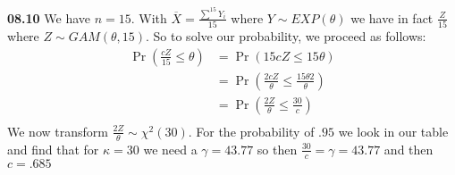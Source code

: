 {\bf 08.10} We have $n = 15$. With $\overline{X} = \frac{\sum^{15} Y_{i}}{15}$ where $Y \sim EXP(\theta)$ we have
in fact $\frac{Z}{15}$ where $Z \sim GAM(\theta,15)$. So to solve our probability, we proceed as follows: \\

\begin{align*}
	\Pr \left( \frac{c Z}{15} \leq \theta \right) & = \Pr \left( 15 c Z  \leq 15 \theta \right) \\
	& = \Pr \left( \frac{ 2 c Z }{\theta} \leq \frac{15 \theta 2}{\theta} \right) \\
	& = \Pr \left( \frac{ 2 Z }{\theta} \leq \frac{30}{c} \right) \\
\end{align*}
We now transform $\frac{ 2 Z }{\theta} \sim \chi^2 (30)$. For the probability of $.95$ we look in our table and
find that for $\kappa = 30$ we need a $\gamma = 43.77$ so then $\frac{30}{c} = \gamma = 43.77$ and then $c = .685$
